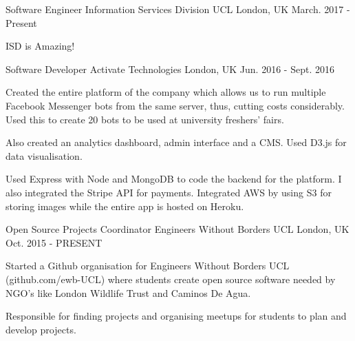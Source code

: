 

\begin{cventries}

\cventry
  {Software Engineer}
  {Information Services Division UCL}
  {London, UK}
  {March. 2017 - Present}
  {
  \begin{cvitems}
    \item {ISD is Amazing!
      }
  \end{cvitems}
  }

  
\cventry
  {Software Developer}
  {Activate Technologies}
  {London, UK}
  {Jun. 2016 - Sept. 2016}
  {
    \begin{cvitems}
      \item {Created the entire platform of the company which allows us to run multiple Facebook Messenger bots from the same server, thus, cutting costs considerably. Used this to create 20 bots to be used at university freshers' fairs.}
       \item {Also created an analytics dashboard, admin interface and a CMS. Used D3.js for data visualisation.}
      \item {Used Express with Node and MongoDB to code the backend for the platform. I also integrated the Stripe API for payments. Integrated AWS by using S3 for storing images while the entire app is hosted on Heroku.}
    \end{cvitems}
  }

\cventry
  {Open Source Projects Coordinator}
  {Engineers Without Borders UCL}
  {London, UK}
  {Oct. 2015 - PRESENT}
  {
    \begin{cvitems}
      \item {Started a Github organisation for Engineers Without Borders UCL (github.com/ewb-UCL) where students create open source software needed by NGO's like London Wildlife Trust and Caminos De Agua.}
      \item {Responsible for finding projects and organising meetups for students to plan and develop projects.}
    \end{cvitems}
  }

\end{cventries}
